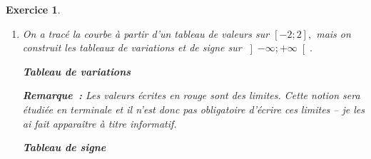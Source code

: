 \documentclass[10pt]{article}
\newtheorem{exo}{Exercice}
\begin{document}
\begin{exo}
\begin{enumerate}
\medskip

\textbf{Remarque~:} L'axe des ordonnées est axe de symétrie pour la courbe.



\item On a tracé la courbe à partir d'un tableau de valeurs sur $\left[-2;2\right],$ mais on construit les tableaux de variations et de signe sur $\left]-\infty;+\infty\right[.$ 

\setlength{\columnseprule}{1pt}


\begin{multicols}{2}

\begin{center}

\textbf{Tableau de variations}

\end{center}

\medskip

\begin{center}
\end{center}

\medskip

\textbf{Remarque~:} Les valeurs écrites en rouge sont des limites. Cette notion sera étudiée en terminale et il n'est donc pas obligatoire d'écrire ces limites -- je les ai fait apparaître à titre informatif. 
\columnbreak

\begin{center}

\textbf{Tableau de signe}

\end{center}

\medskip

\begin{center}
\end{center}

\end{multicols}
\end{enumerate}

\end{exo}
\end{document}
